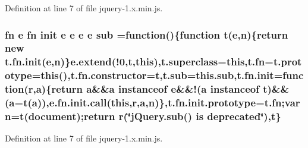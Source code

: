 Definition at line 7 of file jquery-\/1.\+x.\+min.\+js.

\subsubsection[{\texorpdfstring{sub}{sub}}]{ {\bf fn} {\bf e} {\bf fn} {\bf init} {\bf e} {\bf e} {\bf e} {\bf e} sub =function()\{function {\bf t}({\bf e},{\bf n})\{return new {\bf t.\+fn.\+init}({\bf e},{\bf n})\}{\bf e.\+extend}(!0,{\bf t},{\bf this}),t.\+superclass={\bf this},{\bf t.\+fn}={\bf t.\+prototype}={\bf this}(),{\bf t.\+fn.\+constructor}={\bf t},t.\+sub=this.\+sub,{\bf t.\+fn.\+init}=function(r,{\bf a})\{return {\bf a}\&\&{\bf a} instanceof {\bf e}\&\&!({\bf a} instanceof {\bf t})\&\&({\bf a}={\bf t}({\bf a})),e.\+fn.\+init.\+call({\bf this},r,{\bf a},{\bf n})\},{\bf t.\+fn.\+init.\+prototype}={\bf t.\+fn};var {\bf n}={\bf t}({\bf document});return r(\char`\"{}j\+Query.\+sub() is deprecated\char`\"{}),t\}}\hypertarget{jquery-1_8x_8min_8js_abd5a235e9c4fffc368643d11d7701930}{}\label{jquery-1_8x_8min_8js_abd5a235e9c4fffc368643d11d7701930}


Definition at line 7 of file jquery-\/1.\+x.\+min.\+js.

